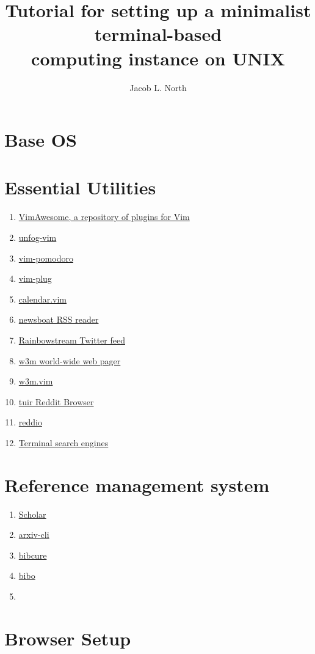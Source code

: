 \documentclass[]{article}
\title{Tutorial for setting up a minimalist terminal-based\\computing instance on UNIX}
\author{Jacob L. North}
\begin{document}
\maketitle

\vfill

\tableofcontents

\vfill

\section{Base OS}

\section{Essential Utilities}
\begin{enumerate}
    \item \href{https://vimawesome.com/}{VimAwesome, a repository of plugins for Vim}
    \item \href{https://github.com/unfog-io/unfog-vim}{unfog-vim}
    \item \href{https://github.com/mnick/vim-pomodoro}{vim-pomodoro}
    \item \href{https://github.com/junegunn/vim-plug}{vim-plug}
    \item \href{https://github.com/itchyny/calendar.vim}{calendar.vim}
    \item \href{https://github.com/newsboat/newsboat}{newsboat RSS reader}
    \item \href{https://github.com/orakaro/rainbowstream}{Rainbowstream Twitter feed}
    \item \href{https://github.com/tats/w3m}{w3m world-wide web pager}
    \item \href{https://github.com/yuratomo/w3m.vim}{w3m.vim}
    \item \href{https://gitlab.com/ajak/tuir}{tuir Reddit Browser}
    \item \href{https://gitlab.com/aaronNG/reddio}{reddio}
    \item \href{https://vitux.com/four-web-browsers-for-the-linux-command-line/}{Terminal search engines}
\end{enumerate}

\section{Reference management system}
\begin{enumerate}
    \item \href{https://github.com/cgxeiji/scholar/}{Scholar}
    \item \href{https://github.com/jacquerie/arxiv-cli}{arxiv-cli}
    \item \href{https://github.com/bibcure/bibcure}{bibcure}
    \item \href{https://github.com/Nagasaki45/bibo}{bibo}
    \item 
\end{enumerate}

\section{Browser Setup}
\end{document}
